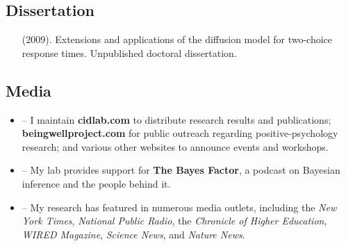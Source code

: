 \documentclass[]{article}
\def\srefs{\begin{itemize}}
\def\i{\item[]\hspace{-2em}}
\def\erefs{\end{itemize}}
\renewcommand{\textbf}[1]{{\bf\color{Bordeaux}#1}}
\begin{document}
\subsection*{Dissertation}
\srefs
\i \vdkh{} (2009).
\newblock  Extensions and applications of the diffusion model for two-choice response times. Unpublished doctoral dissertation. 
\erefs



\subsection*{Media}
\srefs
  \item[--] I maintain \textbf{cidlab.com} to distribute research results and publications; \textbf{beingwellproject.com} for public outreach regarding positive-psychology research; and various other websites to announce events and workshops.
  \item[--] My lab provides support for \textbf{The Bayes Factor}, a podcast on Bayesian inference and the people behind it.
  \item[--] My research has featured in numerous media outlets, including the \textit{New York Times}, \textit{National Public Radio}, the \textit{Chronicle of Higher Education}, \textit{WIRED Magazine}, \textit{Science News}, and \textit{Nature News}.
\erefs
 
\end{document}
